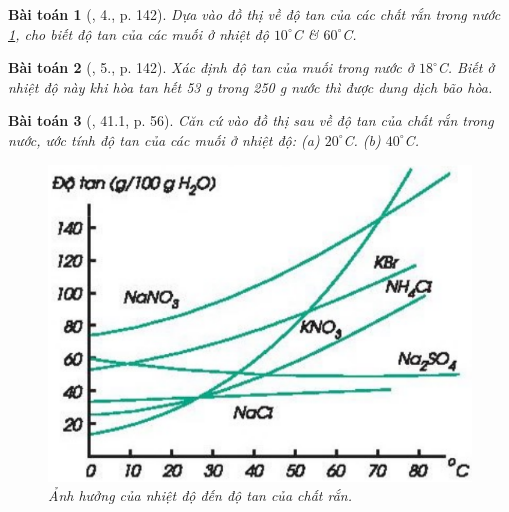 \documentclass{article}
\newtheorem{baitoan}{Bài toán}
\begin{document}
\begin{baitoan}[\cite{SGK_Hoa_Hoc_8}, 4., p. 142]
	Dựa vào đồ thị về độ tan của các chất rắn trong nước \ref{fig:nhiet_do_do_tan_chat_ran}, cho biết độ tan của các muối \emph{} ở nhiệt độ $10^\circ$\emph{C} \& $60^\circ$\emph{C}.
\end{baitoan}

\begin{baitoan}[\cite{SGK_Hoa_Hoc_8}, 5., p. 142]
	Xác định độ tan của muối \emph{} trong nước ở $18^\circ$\emph{C}. Biết ở nhiệt độ này khi hòa tan hết \emph{53 g } trong \emph{250 g} nước thì được dung dịch bão hòa.
\end{baitoan}

\begin{baitoan}[\cite{SBT_Hoa_Hoc_8}, 41.1, p. 56]
	Căn cứ vào đồ thị sau về độ tan của chất rắn trong nước, ước tính độ tan của các muối \emph{} ở nhiệt độ: (a) $20^\circ$\emph{C}. (b) $40^\circ$\emph{C}.
	\begin{figure}[H]
		\centering
		\includegraphics[scale=0.3]{nhiet_do_do_tan_chat_ran}
		\caption{Ảnh hưởng của nhiệt độ đến độ tan của chất rắn.}
		\label{fig:nhiet_do_do_tan_chat_ran}
	\end{figure}
\end{baitoan}
\end{document}
